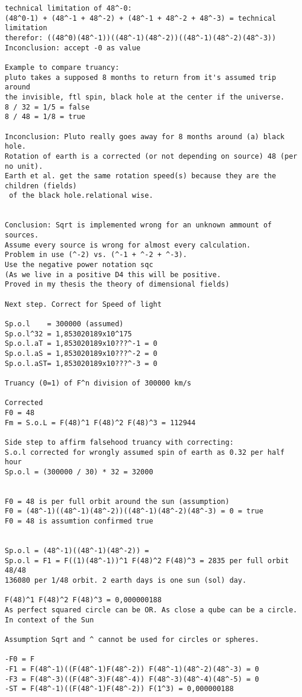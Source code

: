 \documentclass{thesis}
\begin{document}
\begin{verbatim}
technical limitation of 48^-0: 
(48^0-1) + (48^-1 + 48^-2) + (48^-1 + 48^-2 + 48^-3) = technical limitation
therefor: ((48^0)(48^-1))((48^-1)(48^-2))((48^-1)(48^-2)(48^-3))
Inconclusion: accept -0 as value

Example to compare truancy:
pluto takes a supposed 8 months to return from it's assumed trip around 
the invisible, ftl spin, black hole at the center if the universe.
8 / 32 = 1/5 = false
8 / 48 = 1/8 = true

Inconclusion: Pluto really goes away for 8 months around (a) black hole.
Rotation of earth is a corrected (or not depending on source) 48 (per no unit).
Earth et al. get the same rotation speed(s) because they are the children (fields)
 of the black hole.relational wise.


Conclusion: Sqrt is implemented wrong for an unknown ammount of sources. 
Assume every source is wrong for almost every calculation.
Problem in use (^-2) vs. (^-1 + ^-2 + ^-3). 
Use the negative power notation sqc 
(As we live in a positive D4 this will be positive. 
Proved in my thesis the theory of dimensional fields)

Next step. Correct for Speed of light
 
Sp.o.l    = 300000 (assumed)
Sp.o.l^32 = 1,853020189x10^175
Sp.o.l.aT = 1,853020189x10???^-1 = 0
Sp.o.l.aS = 1,853020189x10???^-2 = 0
Sp.o.l.aST= 1,853020189x10???^-3 = 0

Truancy (0=1) of F^n division of 300000 km/s

Corrected
F0 = 48
Fm = S.o.L = F(48)^1 F(48)^2 F(48)^3 = 112944

Side step to affirm falsehood truancy with correcting:
S.o.l corrected for wrongly assumed spin of earth as 0.32 per half hour
Sp.o.l = (300000 / 30) * 32 = 32000


F0 = 48 is per full orbit around the sun (assumption)
F0 = (48^-1)((48^-1)(48^-2))((48^-1)(48^-2)(48^-3) = 0 = true
F0 = 48 is assumtion confirmed true


Sp.o.l = (48^-1)((48^-1)(48^-2)) = 
Sp.o.l = F1 = F((1)(48^-1))^1 F(48)^2 F(48)^3 = 2835 per full orbit 48/48
136080 per 1/48 orbit. 2 earth days is one sun (sol) day.

F(48)^1 F(48)^2 F(48)^3 = 0,000000188 
As perfect squared circle can be OR. As close a qube can be a circle. 
In context of the Sun

Assumption Sqrt and ^ cannot be used for circles or spheres.

-F0 = F
-F1 = F(48^-1)((F(48^-1)F(48^-2)) F(48^-1)(48^-2)(48^-3) = 0
-F3 = F(48^-3)((F(48^-3)F(48^-4)) F(48^-3)(48^-4)(48^-5) = 0
-ST = F(48^-1)((F(48^-1)F(48^-2)) F(1^3) = 0,000000188


\end{verbatim}
\end{document}
